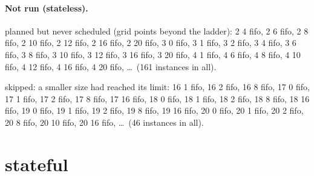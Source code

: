 \documentclass[10pt]{article}
\begin{document}
\paragraph{Not run (stateless).}
planned but never scheduled (grid points beyond the ladder): 2 4 fifo, 2 6 fifo, 2 8 fifo, 2 10 fifo, 2 12 fifo, 2 16 fifo, 2 20 fifo, 3 0 fifo, 3 1 fifo, 3 2 fifo, 3 4 fifo, 3 6 fifo, 3 8 fifo, 3 10 fifo, 3 12 fifo, 3 16 fifo, 3 20 fifo, 4 1 fifo, 4 6 fifo, 4 8 fifo, 4 10 fifo, 4 12 fifo, 4 16 fifo, 4 20 fifo, \ldots\ (161 instances in all).\par
skipped: a smaller size had reached its limit: 16 1 fifo, 16 2 fifo, 16 8 fifo, 17 0 fifo, 17 1 fifo, 17 2 fifo, 17 8 fifo, 17 16 fifo, 18 0 fifo, 18 1 fifo, 18 2 fifo, 18 8 fifo, 18 16 fifo, 19 0 fifo, 19 1 fifo, 19 2 fifo, 19 8 fifo, 19 16 fifo, 20 0 fifo, 20 1 fifo, 20 2 fifo, 20 8 fifo, 20 10 fifo, 20 16 fifo, \ldots\ (46 instances in all).\par
\section*{stateful}
\end{document}
